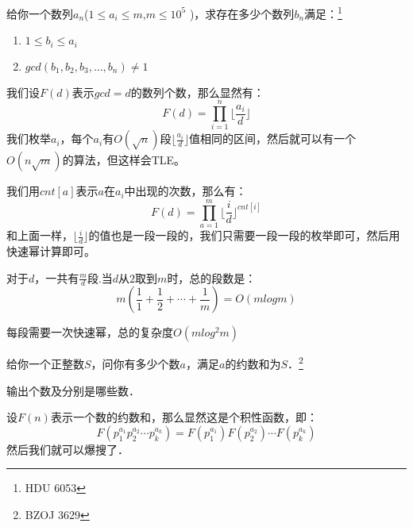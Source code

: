 \documentclass{beamer}
\begin{document}
		\begin{frame}
			给你一个数列${a_n}$($1 \leq a_i \leq m$,$m \leq 10^5$ )，求存在多少个数列${b_n}$满足：\footnote{HDU 6053}
			\begin{enumerate}
				\item $1 \leq b_i \leq a_i $
				\item $gcd(b_1,b_2,b_3,\dots,b_n) \neq 1$
			\end{enumerate}
			
			
			\pause 
			我们设$F(d)$表示$gcd=d$的数列个数，那么显然有：
			$$
				F(d) = \prod_{i = 1}^{n} \lfloor \frac{a_i}{d} \rfloor
			$$
			我们枚举$a_i$，每个$a_i$有$O(\sqrt{n})$段$\lfloor \frac{a_i}{d} \rfloor$值相同的区间，然后就可以有一个$O(n\sqrt{m})$的算法，但这样会TLE。
			
			
		\end{frame}
		\begin{frame}
			我们用$cnt[a]$表示$a$在$a_i$中出现的次数，那么有：
			$$
				F(d) = \prod_{a=1}^{m} \lfloor \frac{i}{d} \rfloor^{cnt[i]}
			$$
			和上面一样，$ \lfloor \frac{i}{d} \rfloor$的值也是一段一段的，我们只需要一段一段的枚举即可，然后用快速幂计算即可。
			
			对于$d$，一共有$\frac{m}{d}$段.当$d$从$2$取到$m$时，总的段数是：
			$$
				m(\frac{1}{1} + \frac{1}{2} + \cdots + \frac{1}{m}) = O(mlogm)
			$$
			
			每段需要一次快速幂，总的复杂度$O(mlog^2m)$
		\end{frame}
		\begin{frame}
			给你一个正整数$S$，问你有多少个数$a$，满足$a$的约数和为$S$．\footnote{BZOJ 3629}
			
			输出个数及分别是哪些数．
			
			\pause
			
			设$F(n)$表示一个数的约数和，那么显然这是个积性函数，即：
			$$
				F(p_1^{a_1}p_2^{a_2}\cdots p_k^{a_k}) = F(p_1^{a_1})F(p_2^{a_2})\cdots F(p_k^{a_k})
			$$
			然后我们就可以爆搜了．
		\end{frame}
\end{document}
